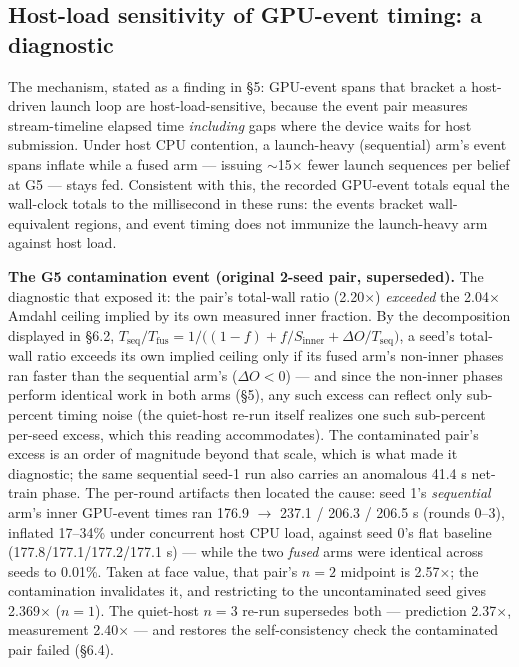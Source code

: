 \documentclass[11pt]{article}
\begin{document}
\subsection{Host-load sensitivity of GPU-event timing: a diagnostic}

The mechanism, stated as a finding in \S5: GPU-event spans that bracket a host-driven
launch loop are host-load-sensitive, because the event pair measures stream-timeline
elapsed time \emph{including} gaps where the device waits for host submission. Under
host CPU contention, a launch-heavy (sequential) arm's event spans inflate while a fused
arm --- issuing $\sim$15$\times$ fewer launch sequences per belief at G5 --- stays fed.
Consistent with this, the recorded GPU-event totals equal the wall-clock totals to the
millisecond in these runs: the events bracket wall-equivalent regions, and event timing
does not immunize the launch-heavy arm against host load.

\textbf{The G5 contamination event (original 2-seed pair, superseded).} The diagnostic
that exposed it: the pair's total-wall ratio (2.20$\times$) \emph{exceeded} the
2.04$\times$ Amdahl ceiling implied by its own measured inner fraction. By the
decomposition displayed in \S6.2, $T_{\text{seq}}/T_{\text{fus}} = 1/\big((1-f) +
f/S_{\text{inner}} + \Delta O/T_{\text{seq}}\big)$, a seed's total-wall ratio exceeds
its own implied ceiling only if its fused arm's non-inner phases ran faster than the
sequential arm's ($\Delta O < 0$) --- and since the non-inner phases perform identical
work in both arms (\S5), any such excess can reflect only sub-percent timing noise (the
quiet-host re-run itself realizes one such sub-percent per-seed excess, which this
reading accommodates). The contaminated pair's excess is an order of magnitude beyond
that scale, which is what made it diagnostic; the same sequential seed-1 run also
carries an anomalous 41.4 s net-train phase. The per-round artifacts then located the
cause: seed 1's \emph{sequential} arm's inner GPU-event times ran 176.9 $\to$ 237.1 /
206.3 / 206.5 s (rounds 0--3), inflated 17--34\% under concurrent host CPU load, against
seed 0's flat baseline (177.8/177.1/177.2/177.1 s) --- while the two \emph{fused} arms
were identical across seeds to 0.01\%. Taken at face value, that pair's $n{=}2$ midpoint
is 2.57$\times$; the contamination invalidates it, and restricting to the uncontaminated
seed gives 2.369$\times$ ($n{=}1$). The quiet-host $n{=}3$ re-run supersedes both ---
prediction 2.37$\times$, measurement 2.40$\times$ --- and restores the self-consistency
check the contaminated pair failed (\S6.4).
\end{document}
